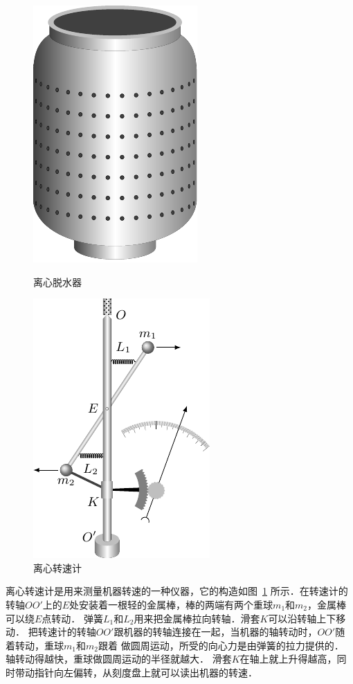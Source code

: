 \begin{figure}[htbp]
    \centering
    \begin{minipage}[t]{0.48\textwidth}
        \centering
        \includegraphics{fig/A/4-29.pdf}
        \caption{离心脱水器}\label{fig_A_4-29}
    \end{minipage}
    \begin{minipage}[t]{0.48\textwidth}
        \centering
        \includegraphics{fig/A/4-30.pdf}
        \caption{离心转速计}\label{fig_A_4-30}
    \end{minipage}
\end{figure}

离心转速计是用来测量机器转速的一种仪器，它的构造如图~\ref{fig_A_4-30} 所示．在转速计的转轴$OO'$上的$E$处安装着一根轻的金属棒，棒的两端有两个重球$m_1$和$m_2$，金属棒可以绕$E$点转动．
弹簧$L_1$和$L_2$用来把金属棒拉向转轴．滑套$K$可以沿转轴上下移动．
把转速计的转轴$OO'$跟机器的转轴连接在一起，当机器的轴转动时，$OO'$随着转动，重球$m_1$和$m_2$跟着
做圆周运动，所受的向心力是由弹簧的拉力提供的．
轴转动得越快，重球做圆周运动的半径就越大．
滑套$K$在轴上就上升得越高，同时带动指针向左偏转，从刻度盘上就可以读出机器的转速．


